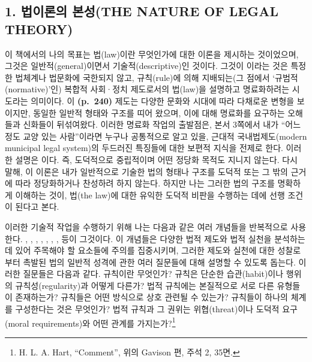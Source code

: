 \subsection{1. 법이론의 본성(THE NATURE OF LEGAL
THEORY)}\label{uxbc95uxc774uxb860uxc758-uxbcf8uxc131the-nature-of-legal-theory}

이 책에서의 나의 목표는 법(law)이란 무엇인가에 대한 이론을 제시하는
것이었으며, 그것은 일반적(general)이면서 기술적(descriptive)인 것이다.
그것이 이라는 것은 특정한 법체계나 법문화에
국한되지 않고, 규칙(rule)에 의해 지배되는(그 점에서
`규범적(normative)'인) 복합적 사회·정치 제도로서의 법(law)을 설명하고
명료화하려는 시도라는 의미이다. 이 \textbf{(p.~240)} 제도는 다양한
문화와 시대에 따라 다채로운 변형을 보이지만, 동일한 일반적 형태와 구조를
띠어 왔으며, 이에 대해 명료화를 요구하는 오해들과 신화들이 뒤섞여왔다.
이러한 명료화 작업의 출발점은, 본서 3쪽에서 내가 ``어느 정도 교양 있는
사람''이라면 누구나 공통적으로 알고 있을, 근대적 국내법제도(modern
municipal legal system)의 두드러진 특징들에 대한 보편적 지식을 전제로
한다. 이러한 설명은 이다. 즉, 도덕적으로
중립적이며 어떤 정당화 목적도 지니지 않는다. 다시 말해, 이 이론은 내가
일반적으로 기술한 법의 형태나 구조를 도덕적 또는 그 밖의 근거에 따라
정당화하거나 찬성하려 하지 않는다. 하지만 나는 그러한 법의 구조를
명확하게 이해하는 것이, 법(the law)에 대한 유익한 도덕적 비판을 수행하는
데에 선행 조건이 된다고 본다.

이러한 기술적 작업을 수행하기 위해 나는 다음과 같은 여러 개념들을
반복적으로 사용한다. ,
, , , , , ,  등이 그것이다.
이 개념들은 다양한 법적 제도와 법적 실천을 분석하는 데 있어 주목해야 할
요소들에 주의를 집중시키며, 그러한 제도와 실천에 대한 성찰로부터 촉발된
법의 일반적 성격에 관한 여러 질문들에 대해 설명할 수 있도록 돕는다.
이러한 질문들은 다음과 같다. 규칙이란 무엇인가? 규칙은 단순한
습관(habit)이나 행위의 규칙성(regularity)과 어떻게 다른가? 법적 규칙에는
본질적으로 서로 다른 유형들이 존재하는가? 규칙들은 어떤 방식으로 상호
관련될 수 있는가? 규칙들이 하나의 체계를 구성한다는 것은 무엇인가? 법적
규칙과 그 권위는 위협(threat)이나 도덕적 요구(moral requirements)와 어떤
관계를 가지는가?\footnote{H. L. A. Hart, ``Comment'', 위의 Gavison 편,
  주석 2, 35면.}


